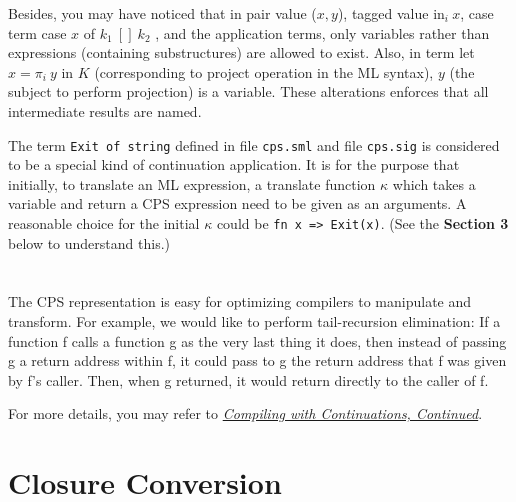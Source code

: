 \documentclass{article}
\theoremstyle{definition}
\theoremstyle{remark}
\numberwithin{equation}{section}
\begin{document}
Besides, you may have noticed that in pair value ($x,y$), tagged value
\textsf{in}$_i\ x$, case term \textsf{case} $x$ \textsf{of} $k_1\ [\!]\ k_2$
, and the application terms, only variables rather than expressions
 (containing substructures) are allowed to exist.
Also, in term \textsf{let }$x = \pi _i\ y$\textsf{ in }$K$
(corresponding to project operation in the ML syntax),
$y$ (the subject to perform projection) is a variable.
  These alterations enforces that all intermediate results are named.

The term \texttt{Exit of string} defined in file \texttt{cps.sml}
and file \texttt{cps.sig} is considered to be a special kind of continuation
  application. It is for the purpose that initially, to translate an ML expression,
 a translate function $\kappa$ which takes a variable and return a CPS
 expression need to be given as an arguments. A reasonable choice for the initial
 $\kappa$ could be \texttt{fn x => Exit(x)}. (See the \textbf{Section 3}
 below to understand this.)\\

\\\\

The CPS representation is easy for optimizing compilers to manipulate and
transform. For example, we would like to perform tail-recursion elimination:
 If a function f calls a function g as the very last thing it does,
then instead of passing g a return address within f,
it could pass to g the return address that f was given by f's caller.
Then, when g returned, it would return directly to the caller of f.

For more details, you may refer to \href{
http://research.microsoft.com/pubs/64044/compilingwithcontinuationscontinued.pdf}
{\emph{Compiling with Continuations, Continued}}.

\section{Closure Conversion}
\end{document}
